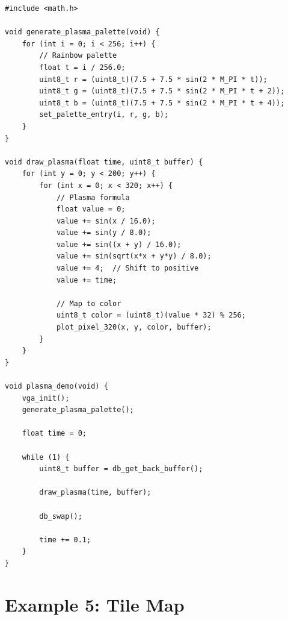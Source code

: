 \documentclass[11pt,letterpaper]{report}
\begin{document}
\begin{lstlisting}[style=c,caption={Animated Plasma Effect}]
#include <math.h>

void generate_plasma_palette(void) {
    for (int i = 0; i < 256; i++) {
        // Rainbow palette
        float t = i / 256.0;
        uint8_t r = (uint8_t)(7.5 + 7.5 * sin(2 * M_PI * t));
        uint8_t g = (uint8_t)(7.5 + 7.5 * sin(2 * M_PI * t + 2));
        uint8_t b = (uint8_t)(7.5 + 7.5 * sin(2 * M_PI * t + 4));
        set_palette_entry(i, r, g, b);
    }
}

void draw_plasma(float time, uint8_t buffer) {
    for (int y = 0; y < 200; y++) {
        for (int x = 0; x < 320; x++) {
            // Plasma formula
            float value = 0;
            value += sin(x / 16.0);
            value += sin(y / 8.0);
            value += sin((x + y) / 16.0);
            value += sin(sqrt(x*x + y*y) / 8.0);
            value += 4;  // Shift to positive
            value += time;
            
            // Map to color
            uint8_t color = (uint8_t)(value * 32) % 256;
            plot_pixel_320(x, y, color, buffer);
        }
    }
}

void plasma_demo(void) {
    vga_init();
    generate_plasma_palette();
    
    float time = 0;
    
    while (1) {
        uint8_t buffer = db_get_back_buffer();
        
        draw_plasma(time, buffer);
        
        db_swap();
        
        time += 0.1;
    }
}
\end{lstlisting}

\section{Example 5: Tile Map}
\end{document}
